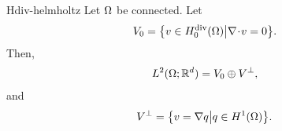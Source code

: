 
\begin{Theorem}{Hdiv-helmholtz}
  Let $\Omega$ be connected. Let
  \begin{gather}
    \label{eq:darcy:1}
    V_0 = \bigl\{ v\in H^{\text{div}}_0(\Omega) \big\vert
    \nabla\!\cdot\! v = 0 \bigr\}.
  \end{gather}
  Then,
  \begin{gather}
    L^2(\Omega;\mathbb R^d) = V_0 \oplus V^\perp,
  \end{gather}
  and
  \begin{gather}
    V^\perp = \bigl\{ v = \nabla q \big\vert
    q\in H^1(\Omega) \bigr\}.
  \end{gather}
\end{Theorem}

